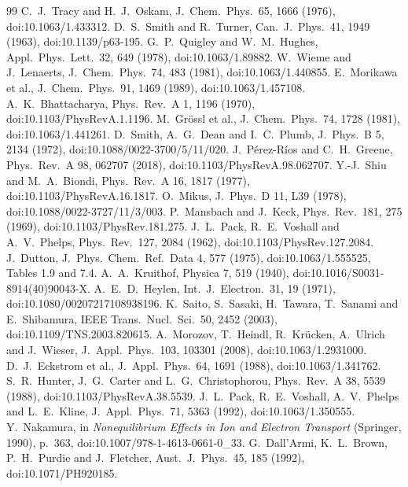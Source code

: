 \documentclass[11pt]{article}
\begin{document}
\begin{thebibliography}{99}
 C.~J.~Tracy and H.~J.~Oskam, J.\ Chem.\ Phys.\ 65, 1666 (1976), doi:10.1063/1.433312.
 D.~S.~Smith and R.~Turner, Can.\ J.\ Phys.\ 41, 1949 (1963), doi:10.1139/p63-195.
 G.~P.~Quigley and W.~M.~Hughes, Appl.\ Phys.\ Lett.\ 32, 649 (1978), doi:10.1063/1.89882.
 W.~Wieme and J.~Lenaerts, J.\ Chem.\ Phys.\ 74, 483 (1981), doi:10.1063/1.440855.
 E.~Morikawa et al., J.\ Chem.\ Phys.\ 91, 1469 (1989), doi:10.1063/1.457108.
 A.~K.~Bhattacharya, Phys.\ Rev.\ A 1, 1196 (1970), doi:10.1103/PhysRevA.1.1196.
 M.~Gr\"ossl et al., J.\ Chem.\ Phys.\ 74, 1728 (1981), doi:10.1063/1.441261.
 D.~Smith, A.~G.~Dean and I.~C.~Plumb, J.\ Phys.\ B 5, 2134 (1972), doi:10.1088/0022-3700/5/11/020.
 J.~P\'erez-R\'ios and C.~H.~Greene, Phys.\ Rev.\ A 98, 062707 (2018), doi:10.1103/PhysRevA.98.062707.
 Y.-J.~Shiu and M.~A.~Biondi, Phys.\ Rev.\ A 16, 1817 (1977), doi:10.1103/PhysRevA.16.1817.
 O.~Mikus, J.\ Phys.\ D 11, L39 (1978), doi:10.1088/0022-3727/11/3/003.
 P.~Mansbach and J.~Keck, Phys.\ Rev.\ 181, 275 (1969), doi:10.1103/PhysRev.181.275.
 J.~L.~Pack, R.~E.~Voshall and A.~V.~Phelps, Phys.\ Rev.\ 127, 2084 (1962), doi:10.1103/PhysRev.127.2084.
 J.~Dutton, J.\ Phys.\ Chem.\ Ref.\ Data 4, 577 (1975), doi:10.1063/1.555525, Tables 1.9 and 7.4.
 A.~A.~Kruithof, Physica 7, 519 (1940), doi:10.1016/S0031-8914(40)90043-X.
 A.~E.~D.~Heylen, Int.\ J.\ Electron.\ 31, 19 (1971), doi:10.1080/00207217108938196.
 K.~Saito, S.~Sasaki, H.~Tawara, T.~Sanami and E.~Shibamura, IEEE Trans.\ Nucl.\ Sci.\ 50, 2452 (2003), doi:10.1109/TNS.2003.820615.
 A.~Morozov, T.~Heindl, R.~Kr\"ucken, A.~Ulrich and J.~Wieser, J.\ Appl.\ Phys.\ 103, 103301 (2008), doi:10.1063/1.2931000.
 D.~J.~Eckstrom et al., J.\ Appl.\ Phys.\ 64, 1691 (1988), doi:10.1063/1.341762.
 S.~R.~Hunter, J.~G.~Carter and L.~G.~Christophorou, Phys.\ Rev.\ A 38, 5539 (1988), doi:10.1103/PhysRevA.38.5539.
 J.~L.~Pack, R.~E.~Voshall, A.~V.~Phelps and L.~E.~Kline, J.\ Appl.\ Phys.\ 71, 5363 (1992), doi:10.1063/1.350555.
 Y.~Nakamura, in \emph{Nonequilibrium Effects in Ion and Electron Transport} (Springer, 1990), p.~363, doi:10.1007/978-1-4613-0661-0\_33.
 G.~Dall'Armi, K.~L.~Brown, P.~H.~Purdie and J.~Fletcher, Aust.\ J.\ Phys.\ 45, 185 (1992), doi:10.1071/PH920185.

\end{thebibliography}
\end{document}

